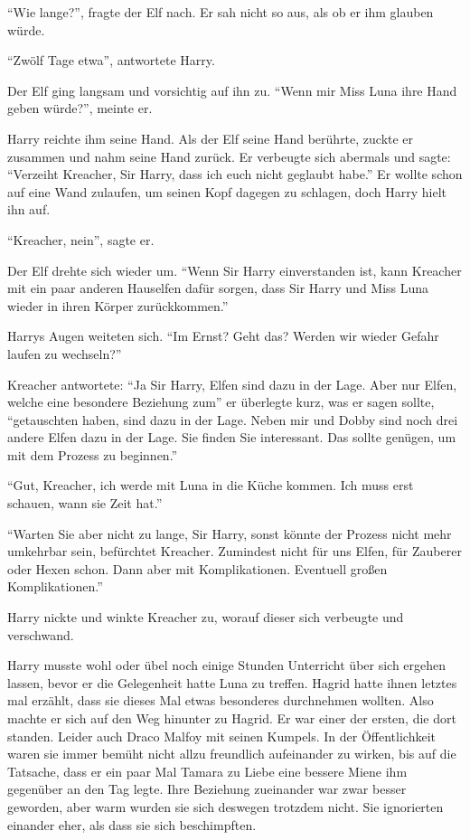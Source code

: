 \enquote{Wie lange?}, fragte der Elf nach. Er sah nicht so aus, als ob er ihm glauben würde.

\enquote{Zwölf Tage etwa}, antwortete Harry.

Der Elf ging langsam und vorsichtig auf ihn zu. \enquote{Wenn mir Miss Luna ihre Hand geben würde?}, meinte er.

Harry reichte ihm seine Hand. Als der Elf seine Hand berührte, zuckte er zusammen und nahm seine Hand zurück. Er verbeugte sich abermals und sagte: \enquote{Verzeiht Kreacher, Sir Harry, dass ich euch nicht geglaubt habe.} Er wollte schon auf eine Wand zulaufen, um seinen Kopf dagegen zu schlagen, doch Harry hielt ihn auf.

\enquote{Kreacher, nein}, sagte er.

Der Elf drehte sich wieder um. \enquote{Wenn Sir Harry einverstanden ist, kann Kreacher mit ein paar anderen Hauselfen dafür sorgen, dass Sir Harry und Miss Luna wieder in ihren Körper zurückkommen.}

Harrys Augen weiteten sich. \enquote{Im Ernst? Geht das? Werden wir wieder Gefahr laufen zu wechseln?}

Kreacher antwortete: \enquote{Ja Sir Harry, Elfen sind dazu in der Lage. Aber nur Elfen, welche eine besondere Beziehung zum\abs} er überlegte kurz, was er sagen sollte, \enquote{getauschten haben, sind dazu in der Lage. Neben mir und Dobby sind noch drei andere Elfen dazu in der Lage. Sie finden Sie interessant. Das sollte genügen, um mit dem Prozess zu beginnen.}

\enquote{Gut, Kreacher, ich werde mit Luna in die Küche kommen. Ich muss erst schauen, wann sie Zeit hat.} 

\enquote{Warten Sie aber nicht zu lange, Sir Harry, sonst könnte der Prozess nicht mehr umkehrbar sein, befürchtet Kreacher. Zumindest nicht für uns Elfen, für Zauberer oder Hexen schon. Dann aber mit Komplikationen. Eventuell großen Komplikationen.}

Harry nickte und winkte Kreacher zu, worauf dieser sich verbeugte und verschwand.

Harry musste wohl oder übel noch einige Stunden Unterricht über sich ergehen lassen, bevor er die Gelegenheit hatte Luna zu treffen. Hagrid hatte ihnen letztes mal erzählt, dass sie dieses Mal etwas besonderes durchnehmen wollten. Also machte er sich auf den Weg hinunter zu Hagrid. Er war einer der ersten, die dort standen. Leider auch Draco Malfoy mit seinen Kumpels. In der Öffentlichkeit waren sie immer bemüht nicht allzu freundlich aufeinander zu wirken, bis auf die Tatsache, dass er ein paar Mal Tamara zu Liebe eine bessere Miene ihm gegenüber an den Tag legte. Ihre Beziehung zueinander war zwar besser geworden, aber warm wurden sie sich deswegen trotzdem nicht. Sie ignorierten einander eher, als dass sie sich beschimpften.

